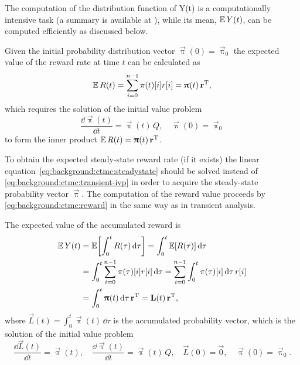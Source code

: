 The computation of the distribution function of Y(t) is a
computationally intensive task (a summary is available at \citep[Table
1]{RACZ02h}), while its mean, $\operatorname{\mathbb{E}} Y(t)$, can be computed
efficiently as discussed below.

Given the initial probability distribution vector
$\vec{\uppi}(0) = \vec{\uppi}_0$ the expected value of the reward rate
at time $t$ can be calculated as
\begin{equation}
  \label{eq:background:ctmc:reward}
  \operatorname{\mathbb{E}} R(t) = \sum_{i = 0}^{n - 1} \pi(t)[i] r[i] = \bm{\mathrm{\uppi}}(t)
  \, \bm{\mathrm{r}}^{\mathrm{T}} \text,
\end{equation}
which requires the solution of the initial value problem%
~\citep{DBLP:journals/cor/Grassmann77,reibman1989markov}
\begin{equation}
  \label{eq:background:ctmc:transient-ivp}
  \frac{\dd \vec{\uppi}(t)}{\dd t} = \vec{\uppi}(t) \, Q, \quad
  \vec{\uppi}(0) = \vec{\uppi}_0
\end{equation}
to form the inner product $\operatorname{\mathbb{E}} R(t) = \bm{\mathrm{\uppi}}(t) \, \bm{\mathrm{r}}^{\mathrm{T}}$.

To obtain the expected steady-state reward rate (if it exists) the
linear equation~\eqref{eq:background:ctmc:steadystate} should be
solved instead of \cref{eq:background:ctmc:transient-ivp} in order to
acquire the steady-state probability vector $\vec{\uppi}$. The
computation of the reward value proceeds by
\cref{eq:background:ctmc:reward} in the same way as in transient
analysis.

The expected value of the accumulated reward is
\begin{align}
  \Ex Y(t) &= \Ex\mleft[ \int_0^t R(\tau) \,\dd\tau \mright] =
             \int_0^t \Ex[R(\tau)] \,\dd\tau \\
           &= \int_0^t \sum_{i = 0}^{n - 1} \pi(\tau)[i] r[i]
             \,\dd\tau = \sum_{i = 0}^{n - 1} \int_0^t \pi(\tau)[i]
             \,\dd\tau \, r[i] \\
           &= \int_0^t \vec{\uppi}(t) \,\dd\tau \, \vec{r}^\T =
             \vec{L}(t) \, \vec{r}^\T \text,
\end{align}
where $\vec{L}(t) = \int_0^t \vec{\uppi}(t) \,\dd\tau$ is the accumulated
probability vector, which is the solution of the initial value
problem~\citep{reibman1989markov}
\begin{equation}
  \label{eq:background:ctmc:L-ivp}
  \frac{\dd \vec{L}(t)}{\dd t} = \vec{\uppi}(t), \quad \frac{\dd
    \vec{\uppi}(t)}{\dd t} = \vec{\uppi}(t) \, Q, \quad
  \vec{L}(0) = \vec{0}, \quad \vec{\uppi}(0) = \vec{\uppi}_0.
\end{equation}

